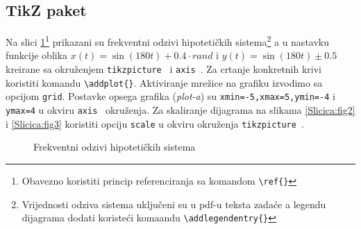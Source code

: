 \documentclass[letterpaper,10pt]{article}
\newcommand{\naredba}[1]
{\texttt{\color{boja1}\textbackslash{}#1\color{black}\{\}}}
\newcommand{\plavo}[1]
{\texttt{\color{blue}#1}\color{black}~}
\begin{document}
\subsection{TikZ paket}
Na slici \ref{Slicica:fig1}\footnote{Obavezno koristiti princip referenciranja sa komandom \naredba{ref}} prikazani su frekventni odzivi hipotetičkih sistema\footnote{Vrijednosti odziva sistema uključeni su u pdf-u teksta zadaće a legendu dijagrama dodati koristeći komaandu \naredba{addlegendentry}\vspace{4mm}} a u nastavku funkcije oblika $x(t) = \sin(180t)+0.4 \cdot rand$ i $y(t) = \sin(180t) \pm 0.5$ kreirane sa okruženjem \plavo{tikzpicture} i \plavo{axis}. Za crtanje konkretnih krivi koristiti komandu \naredba{addplot}. Aktiviranje mrežice na grafiku izvodimo sa opcijom \texttt{grid}. Postavke opsega grafika (\textit{plot-a}) su \texttt{xmin=-5,xmax=5,ymin=-4} i \texttt{ymax=4} u okviru \plavo{axis} okruženja. Za skaliranje dijagrama na slikama \ref{Slicica:fig2} i \ref{Slicica:fig3} koristiti opciju \texttt{scale} u okviru okruženja \plavo{tikzpicture}. 
\newpage
\begin{figure}
\centering{}
\caption{Frekventni odzivi hipotetičkih sistema}
 \label{Slicica:fig1}
\end{figure}\vspace{1mm} \hfill{}
\end{document}
